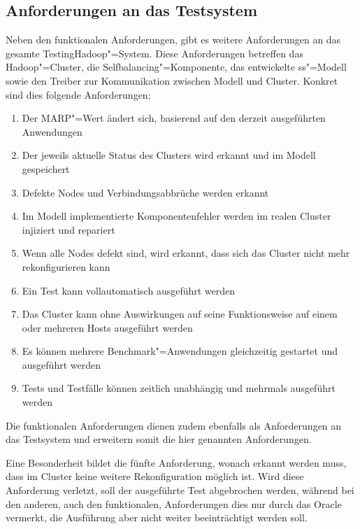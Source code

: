 \subsection{Anforderungen an das Testsystem}
\label{subsec:testRequirements}

Neben den funktionalen Anforderungen, gibt es weitere Anforderungen an das gesamte TestingHadoop"=System.
Diese Anforderungen betreffen das Hadoop"=Cluster, die Selfbalancing"=Komponente, das entwickelte \gls{ss}"=Modell sowie den Treiber zur Kommunikation zwischen Modell und Cluster.
Konkret sind dies folgende Anforderungen:

\begin{enumerate}
    \item Der \gls{MARP}"=Wert ändert sich, basierend auf den derzeit ausgeführten Anwendungen
    \item Der jeweils aktuelle Status des Clusters wird erkannt und im Modell gespeichert
    \item Defekte Nodes und Verbindungsabbrüche werden erkannt
    \item Im Modell implementierte Komponentenfehler werden im realen Cluster injiziert und repariert
    \item Wenn alle Nodes defekt sind, wird erkannt, dass sich das Cluster nicht mehr rekonfigurieren kann
    \item Ein Test kann vollautomatisch ausgeführt werden
    \item Das Cluster kann ohne Auswirkungen auf seine Funktionsweise auf einem oder mehreren Hosts ausgeführt werden
    \item Es können mehrere Benchmark"=Anwendungen gleichzeitig gestartet und ausgeführt werden
    \item Tests und Testfälle können zeitlich unabhängig und mehrmals ausgeführt werden
\end{enumerate}

Die funktionalen Anforderungen dienen zudem ebenfalls als Anforderungen an das Testsystem und erweitern somit die hier genannten Anforderungen.

Eine Besonderheit bildet die fünfte Anforderung, wonach erkannt werden muss, dass im Cluster keine weitere Rekonfiguration möglich ist.
Wird diese Anforderung verletzt, soll der ausgeführte Test abgebrochen werden, während bei den anderen, auch den funktionalen, Anforderungen dies nur durch das Oracle vermerkt, die Ausführung aber nicht weiter beeinträchtigt werden soll.

